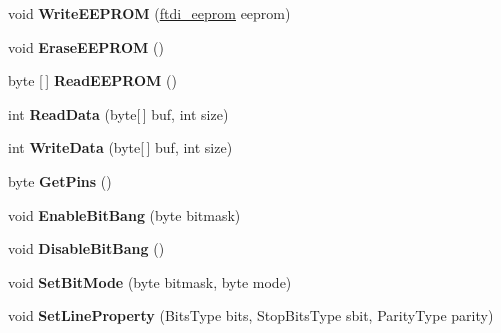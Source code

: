 \begin{DoxyCompactItemize}
void {\bfseries Write\+E\+E\+P\+R\+OM} (\mbox{\hyperlink{structlibftdinet_1_1ftdi__eeprom}{ftdi\+\_\+eeprom}} eeprom)
\item 
\mbox{\label{classlibftdinet_1_1_f_t_d_i_context_a750dc3926f5caa4b878297143ff51b29}} 
void {\bfseries Erase\+E\+E\+P\+R\+OM} ()
\item 
\mbox{\label{classlibftdinet_1_1_f_t_d_i_context_abb167cc5b9d23f6fb43ae8fcd0efeaa8}} 
byte \mbox{[}$\,$\mbox{]} {\bfseries Read\+E\+E\+P\+R\+OM} ()
\item 
\mbox{\label{classlibftdinet_1_1_f_t_d_i_context_a9e2f7436f20bf19e7a49a726d8e6b901}} 
int {\bfseries Read\+Data} (byte\mbox{[}$\,$\mbox{]} buf, int size)
\item 
\mbox{\label{classlibftdinet_1_1_f_t_d_i_context_a9f126648a5753bc700efa2884b2e1d4f}} 
int {\bfseries Write\+Data} (byte\mbox{[}$\,$\mbox{]} buf, int size)
\item 
\mbox{\label{classlibftdinet_1_1_f_t_d_i_context_aace0cce95d9afc74c6ca32272d362afd}} 
byte {\bfseries Get\+Pins} ()
\item 
\mbox{\label{classlibftdinet_1_1_f_t_d_i_context_a56857768350f4f3ade5352786d443aca}} 
void {\bfseries Enable\+Bit\+Bang} (byte bitmask)
\item 
\mbox{\label{classlibftdinet_1_1_f_t_d_i_context_a0bb4d9ab04b09201210e90f398afb12b}} 
void {\bfseries Disable\+Bit\+Bang} ()
\item 
\mbox{\label{classlibftdinet_1_1_f_t_d_i_context_aa5c3058e349fe965d3ca1ec4d1e7df1f}} 
void {\bfseries Set\+Bit\+Mode} (byte bitmask, byte mode)
\item 
\mbox{\label{classlibftdinet_1_1_f_t_d_i_context_ad0357018a797f92867541e910a6049a8}} 
void {\bfseries Set\+Line\+Property} (Bits\+Type bits, Stop\+Bits\+Type sbit, Parity\+Type parity)
\end{DoxyCompactItemize}
